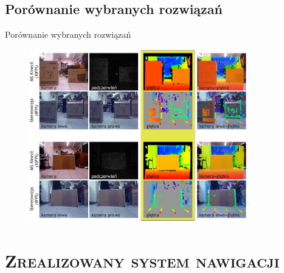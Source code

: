 \documentclass[xcolor=x11names,compress]{beamer}
\renewcommand{\(}{\begin{columns}}
\renewcommand{\)}{\end{columns}}
\newcommand{\<}[1]{\begin{column}{#1}}
\renewcommand{\>}{\end{column}}
\begin{document}
\subsection{Porównanie wybranych rozwiązań}

\begin{frame}{Porównanie wybranych rozwiązań}

\begin{figure}[h!]
\centering
\includegraphics[width=9.5cm]{../Common/img/compare}
\end{figure}

\end{frame}

\section{\scshape Zrealizowany system nawigacji}
\end{document}
